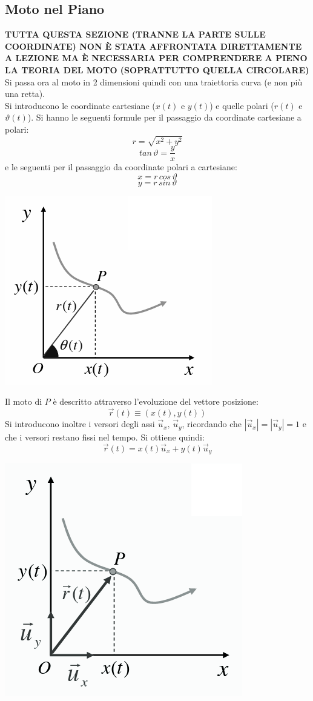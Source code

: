 \documentclass[a4paper,12pt, oneside]{book}
\begin{document}
\subsection{Moto nel Piano}
\textbf{TUTTA QUESTA SEZIONE (TRANNE LA PARTE SULLE COORDINATE) NON È STATA AFFRONTATA DIRETTAMENTE A LEZIONE MA È NECESSARIA PER COMPRENDERE A PIENO LA TEORIA DEL MOTO (SOPRATTUTTO QUELLA CIRCOLARE)}\\
Si passa ora al moto in 2 dimensioni quindi con una traiettoria curva (e non più una retta).\\
Si introducono le coordinate cartesiane (${x}(t)$ e $y(t)$) e quelle polari ($r(t)$ e $\vartheta(t)$). Si hanno le seguenti formule per il passaggio da coordinate cartesiane a polari:
$$r=\sqrt{x^2+y^2}$$
$$tan\,\vartheta=\frac{y}{x}$$
e le seguenti per il passaggio da coordinate polari a cartesiane:
$$x=r\,cos\,\vartheta$$
$$y=r\,sin\,\vartheta$$
\begin{center}
	\includegraphics[scale=0.4]{img/pia.png}
\end{center}
Il moto di $P$ è descritto attraverso l'evoluzione del vettore posizione:
$$\vec{r}(t)\equiv (x(t),y(t))$$
Si introducono inoltre i versori degli assi $\vec{u}_x,\,\vec{u}_y$, ricordando che $|\vec{u}_x|=|\vec{u}_y|=1$ e che i versori restano fissi nel tempo. Si ottiene quindi:
$$\vec{r}(t)=x(t)\vec{u}_x+y(t)\vec{u}_y$$
\begin{center}
	\includegraphics[scale=0.4]{img/pia2.png}
\end{center}
\end{document}
